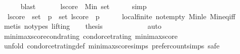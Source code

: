 \begin{isabellebody}
\ \ \ \ \isamarkupfalse%
\ blast\isanewline
\ \ \isanewline
\ \ \isamarkupfalse%
\ {\isachardoublequoteopen}{\isacharquery}{\kern0pt}lscore\ {\isacharequal}{\kern0pt}\ Min\ {\isacharquery}{\kern0pt}set{\isachardoublequoteclose}\isanewline
\ \ \ \ \isamarkupfalse%
\ simp\isanewline
\ \ \isamarkupfalse%
\ {}{\isacharcolon}{\kern0pt}\ {\isachardoublequoteopen}{\isacharquery}{\kern0pt}lscore\ {\isasymin}\ {\isacharquery}{\kern0pt}set\ {\isasymand}\ {\isacharparenleft}{\kern0pt}{\isasymforall}p\ {\isasymin}\ {\isacharquery}{\kern0pt}set{\isachardot}{\kern0pt}\ {\isacharquery}{\kern0pt}lscore\ {\isasymle}\ p{\isacharparenright}{\kern0pt}{\isachardoublequoteclose}\isanewline
\ \ \ \ \isamarkupfalse%
\ local{\isachardot}{\kern0pt}finite\ not{\isacharunderscore}{\kern0pt}empty\ Min{\isacharunderscore}{\kern0pt}le\ Min{\isacharunderscore}{\kern0pt}eq{\isacharunderscore}{\kern0pt}iff\isanewline
\ \ \ \ \isamarkupfalse%
\ {\isacharparenleft}{\kern0pt}metis\ {\isacharparenleft}{\kern0pt}no{\isacharunderscore}{\kern0pt}types{\isacharcomma}{\kern0pt}\ lifting{\isacharparenright}{\kern0pt}{\isacharparenright}{\kern0pt}\isanewline
\ \ \isamarkupfalse%
\ {\isacharquery}{\kern0pt}thesis\isanewline
\ \ \ \ \isamarkupfalse%
\ {\isachardoublequoteopen}{}{\isachardoublequoteclose}\isanewline
\ \ \ \ \isamarkupfalse%
\ auto\isanewline
{}\isamarkupfalse%
%
\endisatagproof
{\isafoldproof}%
%
\isadelimproof
%
\endisadelimproof
%
\isadelimdocument
%
\endisadelimdocument
%
\isatagdocument
%
\isamarkuptrue%
%
\endisatagdocument
{\isafolddocument}%
%
\isadelimdocument
%
\endisadelimdocument
{}\isamarkupfalse%
\ minimax{\isacharunderscore}{\kern0pt}score{\isacharunderscore}{\kern0pt}cond{\isacharunderscore}{\kern0pt}rating{\isacharcolon}{\kern0pt}\ {\isachardoublequoteopen}condorcet{\isacharunderscore}{\kern0pt}rating\ minimax{\isacharunderscore}{\kern0pt}score{\isachardoublequoteclose}\isanewline
%
\isadelimproof
%
\endisadelimproof
%
\isatagproof
{}\isamarkupfalse%
\ {\isacharparenleft}{\kern0pt}unfold\ condorcet{\isacharunderscore}{\kern0pt}rating{\isacharunderscore}{\kern0pt}def\ minimax{\isacharunderscore}{\kern0pt}score{\isachardot}{\kern0pt}simps\ prefer{\isacharunderscore}{\kern0pt}count{\isachardot}{\kern0pt}simps{\isacharcomma}{\kern0pt}\ safe{\isacharparenright}{\kern0pt}\isanewline
\ \ \isamarkupfalse%
\isanewline

\end{isabellebody}
